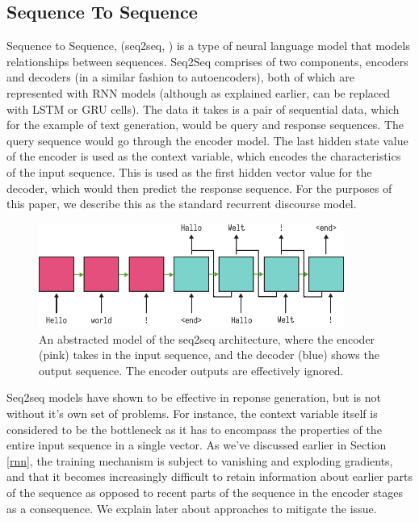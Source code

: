 \documentclass[12pt,twoside]{report}
\begin{document}

\subsection{Sequence To Sequence}

Sequence to Sequence, (seq2seq, \cite{sutskever_sequence_2014}) is a type of neural language model that models relationships between sequences.  Seq2Seq comprises of two components, encoders and decoders (in a similar fashion to autoencoders), both of which are represented with RNN models (although as explained earlier, can be replaced with LSTM or GRU cells). The data it takes is a pair of sequential data, which for the example of text generation, would be query and response sequences. The query sequence would go through the encoder model. The last hidden state value of the encoder is used as the context variable, which encodes the characteristics of the input sequence. This is used as the first hidden vector value for the decoder, which would then predict the response sequence. For the purposes of this paper, we describe this as the standard recurrent discourse model.

\begin{figure}[!ht]
		
\centering
\includegraphics[width=100mm]{diagrams/seq2seq.pdf}
\caption{An abstracted model of the seq2seq architecture, where the encoder (pink) takes in the input sequence, and the decoder (blue) shows the output sequence. The encoder outputs are effectively ignored. \label{seq2seq}}
\end{figure}

Seq2seq models have shown to be effective in reponse generation, but is not without it's own set of problems. For instance, the context variable itself is considered to be the bottleneck as it has to encompass the properties of the entire input sequence in a single vector. As we've discussed earlier in Section \ref{rnn}, the training mechanism is subject to vanishing and exploding gradients, and that it becomes increasingly difficult to retain information about earlier parts of the sequence as opposed to recent parts of the sequence in the encoder stages as a consequence. We explain later about approaches to mitigate the issue.
\end{document}
